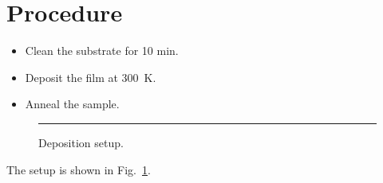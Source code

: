 \documentclass{article}
\begin{document}
\section{Procedure}
\begin{itemize}
  \item Clean the substrate for 10 min.
  \item Deposit the film at 300~K.
  \item Anneal the sample.
\end{itemize}

\begin{figure}[htbp]
  \centering
  \rule{4cm}{2cm}
  \caption{Deposition setup.}\label{fig:setup}
\end{figure}

The setup is shown in Fig.~\ref{fig:setup}.
\end{document}
